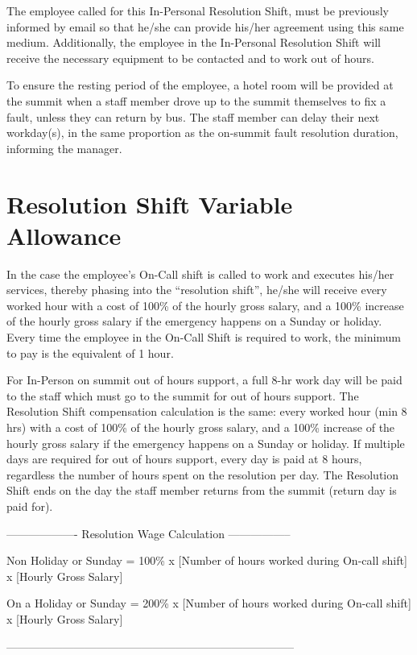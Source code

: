 The employee called for this In-Personal Resolution Shift, must be previously informed by email so that he/she can provide his/her agreement using this same medium. Additionally, the employee in the In-Personal Resolution Shift will receive the necessary equipment to be contacted and to work out of hours.

To ensure the resting period of the employee, a hotel room will be provided at the summit when a staff member drove up to the summit themselves to fix a fault, unless they can return by bus.  The staff member can delay their next workday(s), in the same proportion as the on-summit fault resolution duration, informing the manager.

\section{Resolution Shift Variable Allowance}

In the case the employee's On-Call shift is called to work and executes his/her services, thereby phasing into the ``resolution shift'', he/she will receive every worked hour with a cost of 100\% of the hourly gross salary, and a 100\% increase of the hourly gross salary if the emergency happens on a Sunday or holiday. Every time the employee in the On-Call Shift is required to work, the minimum to pay is the equivalent of 1 hour.

For In-Person on summit out of hours support, a full 8-hr work day will be paid to the staff which must go to the summit for out of hours support.  The Resolution Shift compensation calculation is the same:  every worked hour (min 8 hrs) with a cost of 100\% of the hourly gross salary, and a 100\% increase of the hourly gross salary if the emergency happens on a Sunday or holiday.  If multiple days are required for out of hours support, every day is paid at 8 hours, regardless the number of hours spent on the resolution per day.  The Resolution Shift ends on the day the staff member returns from the summit (return day is paid for).

\begin{center} -------------------  Resolution Wage Calculation ----------------- \end{center}
Non Holiday or Sunday = 100\% x [Number of hours worked during On-call shift] x [Hourly Gross Salary]

\par
On a Holiday or Sunday = 200\% x [Number of hours worked during On-call shift] x [Hourly Gross Salary]
\begin{center} ----------------------------------------------------------------------------- \end{center}


